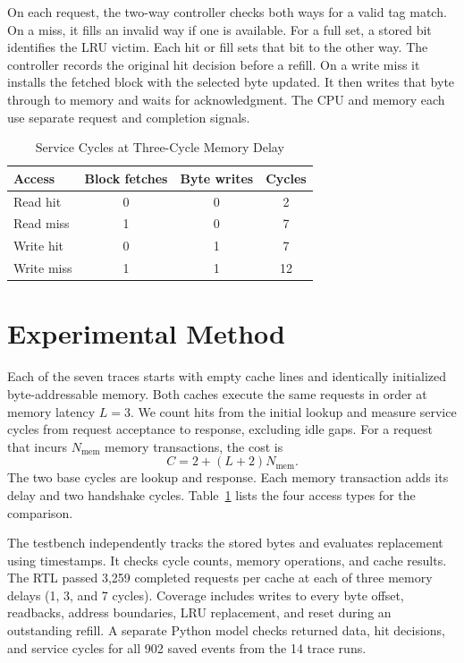 On each request, the two-way controller checks both ways for a valid tag
match. On a miss, it fills an invalid way if one is available. For a full
set, a stored bit identifies the LRU victim. Each hit or fill sets that
bit to the other way. The controller records the original hit decision
before a refill. On a write miss it installs the fetched block with the
selected byte updated. It then writes that byte through to memory and
waits for acknowledgment. The CPU and memory each use separate request
and completion signals.

\begin{table}[!t]
\caption{Service Cycles at Three-Cycle Memory Delay}
\label{tab:cycles}
\centering
\begin{tabular}{lccc}
\toprule
Access & Block fetches & Byte writes & Cycles\\
\midrule
Read hit & 0 & 0 & 2\\
Read miss & 1 & 0 & 7\\
Write hit & 0 & 1 & 7\\
Write miss & 1 & 1 & 12\\
\bottomrule
\end{tabular}
\end{table}

\section{Experimental Method}
Each of the seven traces starts with empty cache lines and identically
initialized byte-addressable memory. Both caches execute the same
requests in order at memory latency $L=3$. We count hits from the initial
lookup and measure service cycles from request acceptance to response,
excluding idle gaps. For a request that incurs $N_{\mathrm{mem}}$ memory
transactions, the cost is
\[
 C = 2 + (L + 2)N_{\mathrm{mem}}.
\]
The two base cycles are lookup and response. Each memory transaction adds
its delay and two handshake cycles. Table~\ref{tab:cycles} lists the four
access types for the comparison.

The testbench independently tracks the stored bytes and evaluates
replacement using timestamps. It checks cycle counts, memory operations,
and cache results. The RTL passed 3,259 completed requests per cache at
each of three memory delays (1, 3, and 7 cycles). Coverage includes
writes to every byte offset, readbacks, address boundaries, LRU
replacement, and reset during an outstanding refill. A separate Python
model checks returned data, hit decisions, and service cycles for all
902 saved events from the 14 trace runs.

